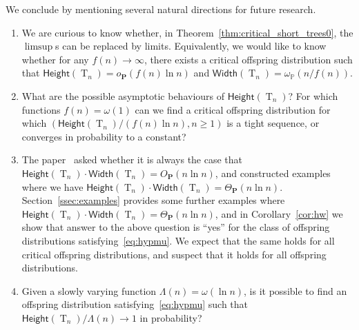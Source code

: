 \documentclass[10pt]{amsart}
\theoremstyle{definition}\newtheorem{defi}[theo]{Definition}\newtheorem{rema}[theo]{Remark}\newtheorem{exam}[theo]{Example}\newtheorem{exem}[theo]{Example}\newtheorem{nota}[theo]{Notation}
\renewcommand{\P}{\mathbb{P}}
\renewcommand{\H}{\mathsf{Height}}
\newcommand{\p}{\mathbf{P}}
\newcommand{\Width}{\mathsf{Width}}
\DeclareMathOperator{\rtree}{T}
\begin{document}
We conclude by mentioning several natural directions for future research.
\begin{enumerate}
\item We are curious to know whether, in Theorem~\ref{thm:critical_short_trees0}, the $\limsup$s can be replaced by limits. Equivalently, we would like to know whether for any $f(n) \to \infty$, there exists a critical offspring distribution such that $\H(\rtree_n)=o_{\p}(f(n)\ln n)$ and $\Width(\rtree_n)=\omega_{\P}(n/f(n))$.
\item What are the possible asymptotic behaviours of $\H(\rtree_n)$? For which functions $f(n)=\omega(1)$ can we find a critical offspring distribution for which $(\H(\rtree_n)/(f(n)\ln n),n \ge 1)$ is a tight sequence, or converges in probability to a constant?
\item The paper~\cite{Add19} asked whether it is always the case that $\H(\rtree_n)\cdot \Width(\rtree_n)=O_{\p}(n\ln n)$, and constructed examples where we have $\H(\rtree_n)\cdot \Width(\rtree_n)=\Theta_{\p}(n\ln n)$. Section~\ref{ssec:examples} provides some further examples where $\H(\rtree_n)\cdot \Width(\rtree_n)=\Theta_{\p}(n\ln n)$, and in Corollary~\ref{cor:hw} we show that answer to the above question is ``yes'' for the class of offspring distributions satisfying~\eqref{eq:hypmu}. We expect that the same holds for all critical offspring distributions, and suspect that it holds for all offspring distributions.
\item Given a slowly varying function $\Lambda(n)=\omega(\ln n)$, is it possible to find an offspring distribution satisfying~\eqref{eq:hypmu} such that $\H(\rtree_{n})/\Lambda(n) \rightarrow 1$ in probability?
\end{enumerate}
\end{document}
